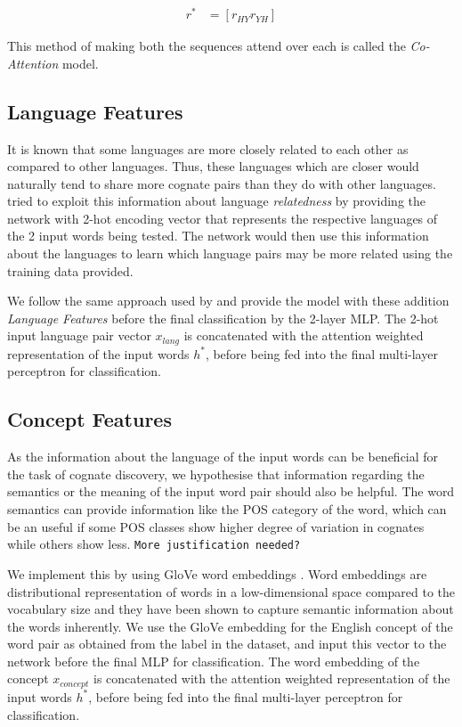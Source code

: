 \documentclass[11pt,letterpaper]{article}
\begin{document}
\begin{align}
r^* &= [r_{HY} r_{YH}]
\end{align}

 This method of making both the sequences attend over each is called the \textit{Co-Attention} model.
 
\subsection{Language Features}

It is known that some languages are more closely related to each other as compared to other languages. Thus, these languages which are closer would naturally tend to share more cognate pairs than they do with other languages. \citet{rama2016siamese} tried to exploit this information about language \textit{relatedness} by providing the network with 2-hot encoding vector that represents the respective languages of the 2 input words being tested. The network would then use this information about the languages to learn which language pairs may be more related using the training data provided.

We follow the same approach used by \citet{rama2016siamese} and provide the model with these addition \textit{Language Features} before the final classification by the 2-layer MLP. The 2-hot input language pair vector $x_{lang}$ is concatenated with the attention weighted representation of the input words $h^{*}$, before being fed into the final multi-layer perceptron for classification.

\subsection{Concept Features}

As the information about the language of the input words can be beneficial for the task of cognate discovery, we hypothesise that information regarding the semantics or the meaning of the input word pair should also be helpful. The word semantics can provide information like the POS category of the word, which can be an useful if some POS classes show higher degree of variation in cognates while others show less. \texttt{More justification needed?}

We implement this by using GloVe word embeddings \citep{pennington2014glove}. Word embeddings are distributional representation of words in a low-dimensional space compared to the vocabulary size and they have been shown to capture semantic information about the words inherently. We use the GloVe embedding for the English concept of the word pair as obtained from the label in the dataset, and input this vector to the network before the final MLP for classification. The word embedding of the concept $x_{concept}$ is concatenated with the attention weighted representation of the input words $h^{*}$, before being fed into the final multi-layer perceptron for classification.
\end{document}
